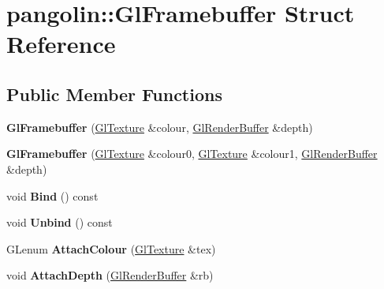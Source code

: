 \hypertarget{structpangolin_1_1_gl_framebuffer}{}\section{pangolin\+:\+:Gl\+Framebuffer Struct Reference}
\label{structpangolin_1_1_gl_framebuffer}
\subsection*{Public Member Functions}
\begin{DoxyCompactItemize}
\item 
{\bfseries Gl\+Framebuffer} (\hyperlink{classpangolin_1_1_gl_texture}{Gl\+Texture} \&colour, \hyperlink{structpangolin_1_1_gl_render_buffer}{Gl\+Render\+Buffer} \&depth)\hypertarget{structpangolin_1_1_gl_framebuffer_a9ed178f1a567d5059415af7fb6f3a802}{}\label{structpangolin_1_1_gl_framebuffer_a9ed178f1a567d5059415af7fb6f3a802}

\item 
{\bfseries Gl\+Framebuffer} (\hyperlink{classpangolin_1_1_gl_texture}{Gl\+Texture} \&colour0, \hyperlink{classpangolin_1_1_gl_texture}{Gl\+Texture} \&colour1, \hyperlink{structpangolin_1_1_gl_render_buffer}{Gl\+Render\+Buffer} \&depth)\hypertarget{structpangolin_1_1_gl_framebuffer_a1d313766c52ab646b07472165bec3d40}{}\label{structpangolin_1_1_gl_framebuffer_a1d313766c52ab646b07472165bec3d40}

\item 
void {\bfseries Bind} () const \hypertarget{structpangolin_1_1_gl_framebuffer_a3fa1d77a5f58af8c2e210d781166d35e}{}\label{structpangolin_1_1_gl_framebuffer_a3fa1d77a5f58af8c2e210d781166d35e}

\item 
void {\bfseries Unbind} () const \hypertarget{structpangolin_1_1_gl_framebuffer_a67b33b3e443abd3989f7fd8ff2f8fee5}{}\label{structpangolin_1_1_gl_framebuffer_a67b33b3e443abd3989f7fd8ff2f8fee5}

\item 
G\+Lenum {\bfseries Attach\+Colour} (\hyperlink{classpangolin_1_1_gl_texture}{Gl\+Texture} \&tex)\hypertarget{structpangolin_1_1_gl_framebuffer_a8d8c4ed61cce0c2f99ec61c01ed1407f}{}\label{structpangolin_1_1_gl_framebuffer_a8d8c4ed61cce0c2f99ec61c01ed1407f}

\item 
void {\bfseries Attach\+Depth} (\hyperlink{structpangolin_1_1_gl_render_buffer}{Gl\+Render\+Buffer} \&rb)\hypertarget{structpangolin_1_1_gl_framebuffer_a5dc6e5f7c468f69de2bb59b87593abe7}{}\label{structpangolin_1_1_gl_framebuffer_a5dc6e5f7c468f69de2bb59b87593abe7}

\end{DoxyCompactItemize}

